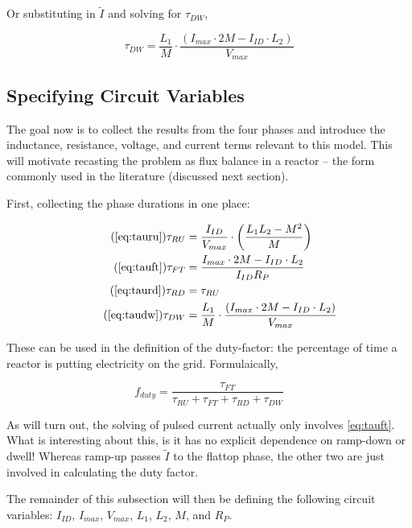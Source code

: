 Or substituting in $\tilde I$ and solving for $\tau_{DW}$,

\begin{equation}
	\label{eq:taudw}
	\tau_{DW} = \frac{L_1}{M} \cdot \frac{ \left( I_{max} \cdot 2 M - I_{ID} \cdot  L_2 \right) }{V_{max}}
\end{equation}

\subsection{Specifying Circuit Variables}

The goal now is to collect the results from the four phases and introduce the inductance, resistance, voltage, and current terms relevant to this model. This will motivate recasting the problem as flux balance in a reactor -- the form commonly used in the literature (discussed next section).

First, collecting the phase durations in one place:

\begin{align}
	\tag{\ref{eq:tauru}}
	\tau_{RU} &= \frac{I_{ID}}{V_{max}} \cdot \left( \frac{ L_1 L_2 - M^2 }{ M } \right) \\
	\tag{\ref{eq:tauft}}
	\tau_{FT} &= \frac{ I_{max} \cdot 2 M - I_{ID} \cdot  L_2 }{I_{ID} R_P} \\
	\tag{\ref{eq:taurd}}
	\tau_{RD} &= \tau_{RU} \\
	\tag{\ref{eq:taudw}}
	\tau_{DW} &= \frac{L_1}{M} \cdot \frac{ \left( I_{max} \cdot 2 M - I_{ID} \cdot  L_2 \right) }{V_{max}}
\end{align}

These can be used in the definition of the duty-factor: the percentage of time a reactor is putting electricity on the grid. Formulaically,

\begin{equation}
	\label{eq:duty}
	f_{duty} = \frac{\tau_{FT}}{\tau_{RU} + \tau_{FT} + \tau_{RD} + \tau_{DW}}
\end{equation}

As will turn out, the solving of pulsed current actually only involves \cref{eq:tauft}. What is interesting about this, is it has no explicit dependence on ramp-down or dwell! Whereas ramp-up passes $\tilde I$ to the flattop phase, the other two are just involved in calculating the duty factor.

The remainder of this subsection will then be defining the following circuit variables: $I_{ID}$, $I_{max}$, $V_{max}$, $L_1$, $L_2$, $M$, and $R_P$.

